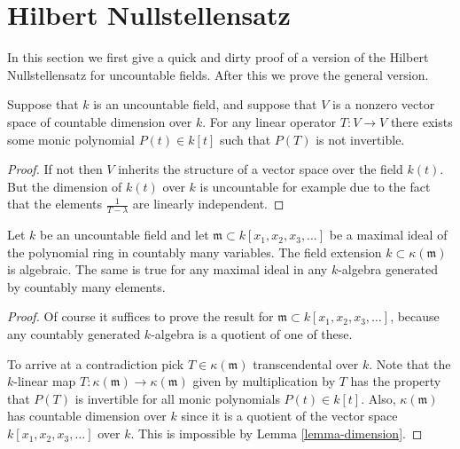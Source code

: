 \section{Hilbert Nullstellensatz}
\label{section-nullstellensatz}

\noindent
In this section we first give a quick and dirty proof
of a version of the Hilbert Nullstellensatz for uncountable
fields. After this we prove the general version.

\begin{lemma}
\label{lemma-dimension}
Suppose that $k$ is an uncountable field,
and suppose that $V$ is a nonzero vector
space of countable dimension over $k$.
For any linear operator $T : V \to V$ there exists
some monic polynomial $P(t) \in k[t]$ such that
$P(T)$ is not invertible.
\end{lemma}

\begin{proof}
If not then $V$ inherits the structure of a vector space over
the field $k(t)$. But the dimension of $k(t)$ over $k$ is
uncountable for example due to the fact that the elements
$\frac{1}{T - \lambda}$ are linearly independent.
\end{proof}

\begin{theorem}
\label{theorem-uncountable-nullstellensatz}
Let $k$ be an uncountable field and let $\mathfrak m \subset 
k[x_1, x_2, x_3, \ldots]$ be a maximal ideal of the polynomial
ring in countably many variables.
The field extension $k \subset \kappa(\mathfrak m)$
is algebraic. The same is true for any maximal ideal in
any $k$-algebra generated by countably many elements.
\end{theorem}

\begin{proof}
Of course it suffices to prove the result for $\mathfrak m \subset 
k[x_1, x_2, x_3, \ldots]$, because any countably generated $k$-algebra
is a quotient of one of these. 

\medskip\noindent
To arrive at a contradiction pick
$T \in \kappa(\mathfrak m)$ transcendental over $k$.
Note that the $k$-linear map $T : \kappa(\mathfrak m)
\to \kappa(\mathfrak m)$ given by multiplication by $T$
has the property that $P(T)$ is invertible for all
monic polynomials $P(t) \in k[t]$.
Also, $\kappa(\mathfrak m)$ has countable dimension
over $k$ since it is a quotient of the vector space
$k[x_1, x_2, x_3, \ldots]$ over $k$.
This is impossible by Lemma \ref{lemma-dimension}.
\end{proof}

